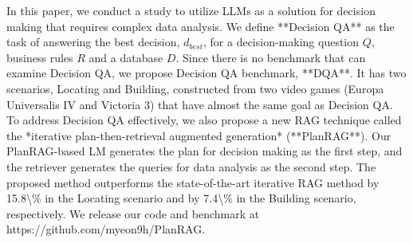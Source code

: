 In this paper, we conduct a study to utilize LLMs as a solution for decision making that requires complex data analysis. We define **Decision QA** as the task of answering the best decision, $d_{best}$, for a decision-making question $Q$, business rules $R$ and a database $D$. Since there is no benchmark that can examine Decision QA, we propose Decision QA benchmark, **DQA**. It has two scenarios, Locating and Building, constructed from two video games (Europa Universalis IV and Victoria 3) that have almost the same goal as Decision QA. To address Decision QA effectively, we also propose a new RAG technique called the *iterative plan-then-retrieval augmented generation* (**PlanRAG**). Our PlanRAG-based LM generates the plan for decision making as the first step, and the retriever generates the queries for data analysis as the second step. The proposed method outperforms the state-of-the-art iterative RAG method by 15.8\textbackslash{}\% in the Locating scenario and by 7.4\textbackslash{}\% in the Building scenario, respectively. We release our code and benchmark at https://github.com/myeon9h/PlanRAG.